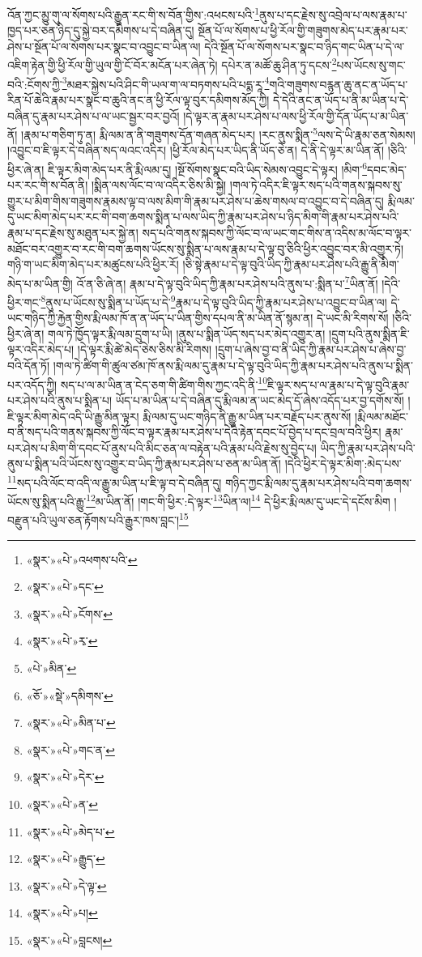 འོན་ཀྱང་མྱུ་གུ་ལ་སོགས་པའི་རྒྱུན་རང་གི་ས་བོན་གྱིས་:འཕངས་པའི་\footnote{«སྣར་»«པེ་»འཕགས་པའི་}ནུས་པ་དང་རྗེས་སུ་འབྲེལ་པ་ལས་རྣམ་པ་ཁྱད་པར་ཅན་ཉིད་དུ་སྐྱེ་བར་དམིགས་པ་དེ་བཞིན་དུ། སྔོན་པོ་ལ་སོགས་པ་ཕྱི་རོལ་གྱི་གཟུགས་མེད་པར་རྣམ་པར་ཤེས་པ་སྔོན་པོ་ལ་སོགས་པར་སྣང་བ་འབྱུང་བ་ཡིན་ལ། དེའི་སྔོན་པོ་ལ་སོགས་པར་སྣང་བ་ཉིད་གང་ཡིན་པ་དེ་ལ་འཇིག་རྟེན་གྱི་ཕྱི་རོལ་གྱི་ཡུལ་གྱི་ངོ་བོར་མངོན་པར་ཞེན་ཏེ། དཔེར་ན་མཚོ་ཆུ་ཤིན་ཏུ་དངས་\footnote{«སྣར་»«པེ་»དང་}པས་ཡོངས་སུ་གང་བའི་:ངོགས་ཀྱི་\footnote{«སྣར་»«པེ་»ངོགས་}མཐར་སྐྱེས་པའི་ཤིང་གི་ཡལ་ག་ལ་བཏགས་པའི་པདྨ་རཱ་\footnote{«སྣར་»«པེ་»རྭ་}གའི་གཟུགས་བརྙན་ཆུ་ནང་ན་ཡོད་པ་རིན་པོ་ཆེའི་རྣམ་པར་སྣང་བ་ཆུའི་ནང་ན་ཕྱི་རོལ་ལྟ་བུར་དམིགས་མོད་ཀྱི། དེ་དེའི་ནང་ན་ཡོད་པ་ནི་མ་ཡིན་པ་དེ་བཞིན་དུ་རྣམ་པར་ཤེས་པ་ལ་ཡང་སྦྱར་བར་བྱའོ། །དེ་ལྟར་ན་རྣམ་པར་ཤེས་པ་ལས་ཕྱི་རོལ་གྱི་དོན་ཡོད་པ་མ་ཡིན་ནོ། །རྣམ་པ་གཅིག་ཏུ་ན། རྨི་ལམ་ན་ནི་གཟུགས་དོན་གཞན་མེད་པར། །རང་ནུས་སྨིན་\footnote{«པེ་»མིན་}ལས་དེ་ཡི་རྣམ་ཅན་སེམས། །འབྱུང་བ་ཇི་ལྟར་དེ་བཞིན་སད་ལའང་འདིར། །ཕྱི་རོལ་མེད་པར་ཡིད་ནི་ཡོད་ཅེ་ན། དེ་ནི་དེ་ལྟར་མ་ཡིན་ནོ། །ཅིའི་ཕྱིར་ཞེ་ན། ཇི་ལྟར་མིག་མེད་པར་ནི་རྨི་ལམ་དུ། །སྔོ་སོགས་སྣང་བའི་ཡིད་སེམས་འབྱུང་དེ་ལྟར། །མིག་\footnote{«ཅོ་»«སྡེ་»དམིགས་}དབང་མེད་པར་རང་གི་ས་བོན་ནི། །སྨིན་ལས་ལོང་བ་ལ་འདིར་ཅིས་མི་སྐྱེ། །གལ་ཏེ་འདིར་ཇི་ལྟར་སད་པའི་གནས་སྐབས་སུ་གྱུར་པ་མིག་གིས་གཟུགས་རྣམས་ལྟ་བ་ལས་མིག་གི་རྣམ་པར་ཤེས་པ་ཆེས་གསལ་བ་འབྱུང་བ་དེ་བཞིན་དུ། རྨི་ལམ་དུ་ཡང་མིག་མེད་པར་རང་གི་བག་ཆགས་སྨིན་པ་ལས་ཡིད་ཀྱི་རྣམ་པར་ཤེས་པ་ཉིད་མིག་གི་རྣམ་པར་ཤེས་པའི་རྣམ་པ་དང་རྗེས་སུ་མཐུན་པར་སྐྱེ་ན། སད་པའི་གནས་སྐབས་ཀྱི་ལོང་བ་ལ་ཡང་གང་གིས་ན་འདིས་མ་ལོང་བ་ལྟར་མཐོང་བར་འགྱུར་བ་རང་གི་བག་ཆགས་ཡོངས་སུ་སྨིན་པ་ལས་རྣམ་པ་དེ་ལྟ་བུ་ཅིའི་ཕྱིར་འབྱུང་བར་མི་འགྱུར་ཏེ། གཉི་ག་ཡང་མིག་མེད་པར་མཚུངས་པའི་ཕྱིར་རོ། །ཅི་སྟེ་རྣམ་པ་དེ་ལྟ་བུའི་ཡིད་ཀྱི་རྣམ་པར་ཤེས་པའི་རྒྱུ་ནི་མིག་མེད་པ་མ་ཡིན་གྱི། འོ་ན་ཅི་ཞེ་ན། རྣམ་པ་དེ་ལྟ་བུའི་ཡིད་ཀྱི་རྣམ་པར་ཤེས་པའི་ནུས་པ་:སྨིན་པ་\footnote{«སྣར་»«པེ་»མིན་པ་}ཡིན་ནོ། །དེའི་ཕྱིར་གང་\footnote{«སྣར་»«པེ་»གང་ན་}ནུས་པ་ཡོངས་སུ་སྨིན་པ་ཡོད་པ་དེ་\footnote{«སྣར་»«པེ་»དེར་}རྣམ་པ་དེ་ལྟ་བུའི་ཡིད་ཀྱི་རྣམ་པར་ཤེས་པ་འབྱུང་བ་ཡིན་ལ། དེ་ཡང་གཉིད་ཀྱི་རྐྱེན་གྱིས་རྨི་ལམ་ཁོ་ན་ན་ཡོད་པ་ཡིན་གྱིས་དཔལ་ནི་མ་ཡིན་ནོ་སྙམ་ན། དེ་ཡང་མི་རིགས་སོ། །ཅིའི་ཕྱིར་ཞེ་ན། གལ་ཏེ་ཁྱོད་ལྟར་རྨི་ལམ་དྲུག་པ་ཡི། །ནུས་པ་སྨིན་ཡོད་སད་པར་མེད་འགྱུར་ན། །དྲུག་པའི་ནུས་སྨིན་ཇི་ལྟར་འདིར་མེད་པ། །དེ་ལྟར་རྨི་ཚེ་མེད་ཅེས་ཅིས་མི་རིགས། །དྲུག་པ་ཞེས་བྱ་བ་ནི་ཡིད་ཀྱི་རྣམ་པར་ཤེས་པ་ཞེས་བྱ་བའི་དོན་ཏོ། །གལ་ཏེ་ཚིག་གི་ཚུལ་ཙམ་ཁོ་ནས་རྨི་ལམ་དུ་རྣམ་པ་དེ་ལྟ་བུའི་ཡིད་ཀྱི་རྣམ་པར་ཤེས་པའི་ནུས་པ་སྨིན་པར་འདོད་ཀྱི། སད་པ་ལ་མ་ཡིན་ན་ངེད་ཅག་གི་ཚིག་གིས་ཀྱང་འདི་ནི་\footnote{«སྣར་»«པེ་»ན་}ཇི་ལྟར་སད་པ་ལ་རྣམ་པ་དེ་ལྟ་བུའི་རྣམ་པར་ཤེས་པའི་ནུས་པ་སྨིན་པ། ཡོད་པ་མ་ཡིན་པ་དེ་བཞིན་དུ་རྨི་ལམ་ན་ཡང་མེད་དོ་ཞེས་འདོད་པར་བྱ་དགོས་སོ། །ཇི་ལྟར་མིག་མེད་འདི་ཡི་རྒྱུ་མིན་ལྟར། རྨི་ལམ་དུ་ཡང་གཉིད་ནི་རྒྱུ་མ་ཡིན་པར་བརྗོད་པར་ནུས་སོ། །རྨི་ལམ་མཐོང་བ་ནི་སད་པའི་གནས་སྐབས་ཀྱི་ལོང་བ་ལྟར་རྣམ་པར་ཤེས་པ་དེའི་རྟེན་དབང་པོ་བྱེད་པ་དང་བྲལ་བའི་ཕྱིར། རྣམ་པར་ཤེས་པ་མིག་གི་དབང་པོ་ནུས་པའི་མིང་ཅན་ལ་བརྟེན་པའི་རྣམ་པའི་རྗེས་སུ་བྱེད་པ། ཡིད་ཀྱི་རྣམ་པར་ཤེས་པའི་ནུས་པ་སྨིན་པའི་ཡོངས་སུ་འགྱུར་བ་ཡིད་ཀྱི་རྣམ་པར་ཤེས་པ་ཅན་མ་ཡིན་ནོ། །དེའི་ཕྱིར་དེ་ལྟར་མིག་:མེད་པས་\footnote{«སྣར་»«པེ་»མེད་པ་}སད་པའི་ལོང་བ་འདི་ལ་རྒྱུ་མ་ཡིན་པ་ཇི་ལྟ་བ་དེ་བཞིན་དུ། གཉིད་ཀྱང་རྨི་ལམ་དུ་རྣམ་པར་ཤེས་པའི་བག་ཆགས་ཡོངས་སུ་སྨིན་པའི་རྒྱུ་\footnote{«སྣར་»«པེ་»རྒྱུད་}མ་ཡིན་ནོ། །གང་གི་ཕྱིར་:དེ་ལྟར་\footnote{«སྣར་»«པེ་»དེ་ལྟ་}ཡིན་ལ།\footnote{«སྣར་»«པེ་»པ།} དེ་ཕྱིར་རྨི་ལམ་དུ་ཡང་དེ་དངོས་མིག །བརྫུན་པའི་ཡུལ་ཅན་རྟོགས་པའི་རྒྱུར་ཁས་བླང་།\footnote{«སྣར་»«པེ་»བླངས།} 